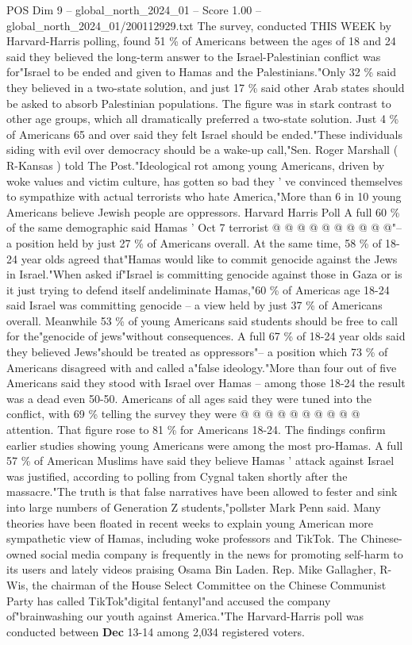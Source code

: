 \begin{textsample}{POS Dim 9 – global\_north\_2024\_01 – Score 1.00 – global\_north\_2024\_01/200112929.txt}  \label{ex:f9_pos_263}
The survey, conducted THIS WEEK by Harvard-Harris polling, found 51 \% of Americans between the ages of 18 and 24 said they believed the long-term answer to the Israel-Palestinian conflict was for"Israel to be ended and given to Hamas and the Palestinians."Only 32 \% said they believed in a two-state solution, and just 17 \% said other Arab states should be asked to absorb Palestinian populations.
The figure was in stark contrast to other age groups, which all dramatically preferred a two-state solution.
Just 4 \% of Americans 65 and over said they felt Israel should be ended."These individuals siding with evil over democracy should be a wake-up call,"Sen.
Roger Marshall ( R-Kansas ) told The Post."Ideological rot among young Americans, driven by woke values and victim culture, has gotten so bad they ' ve convinced themselves to sympathize with actual terrorists who hate America,"More than 6 in 10 young Americans believe Jewish people are oppressors.
Harvard Harris Poll A full 60 \% of the same demographic said Hamas ' Oct 7 terrorist @ @ @ @ @ @ @ @ @ @"-- a position held by just 27 \% of Americans overall.
At the same time, 58 \% of 18-24 year olds agreed that"Hamas would like to commit genocide against the Jews in Israel."When asked if"Israel is committing genocide against those in Gaza or is it just trying to defend itself andeliminate Hamas,"60 \% of Americas age 18-24 said Israel was committing genocide -- a view held by just 37 \% of Americans overall.
Meanwhile 53 \% of young Americans said students should be free to call for the"genocide of jews"without consequences.
A full 67 \% of 18-24 year olds said they believed Jews"should be treated as oppressors"-- a position which 73 \% of Americans disagreed with and called a"false ideology."More than four out of five Americans said they stood with Israel over Hamas -- among those 18-24 the result was a dead even 50-50.
Americans of all ages said they were tuned into the conflict, with 69 \% telling the survey they were @ @ @ @ @ @ @ @ @ @ attention.
That figure rose to 81 \% for Americans 18-24.
The findings confirm earlier studies showing young Americans were among the most pro-Hamas.
A full 57 \% of American Muslims have said they believe Hamas ' attack against Israel was justified, according to polling from Cygnal taken shortly after the massacre."The truth is that false narratives have been allowed to fester and sink into large numbers of Generation Z students,"pollster Mark Penn said.
Many theories have been floated in recent weeks to explain young American more sympathetic view of Hamas, including woke professors and TikTok.
The Chinese-owned social media company is frequently in the news for promoting self-harm to its users and lately videos praising Osama Bin Laden.
Rep.
Mike Gallagher, R-Wis, the chairman of the House Select Committee on the Chinese Communist Party has called TikTok"digital fentanyl"and accused the company of"brainwashing our youth against America."The Harvard-Harris poll was conducted between \textbf{Dec} 13-14 among 2,034 registered voters.

\end{textsample}
